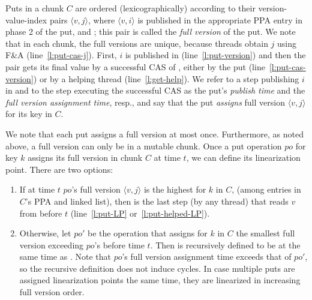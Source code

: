 Puts in a chunk $C$
are ordered (lexicographically) according to their version-value-index   pairs $\langle v, j \rangle$, where
$\langle v, i \rangle$ is published in the appropriate  PPA entry in phase 2 of the put, and ; this pair is called the \emph{full version} of the put.
We note that in each chunk, the full versions are unique, because threads obtain $j$ using F\&A (line~\ref{l:put-cas-j}).
First,  $i$ is published in  (line~\ref{l:put-version}) and then
the  pair gets its final value by a successful CAS of , either by the put (line~\ref{l:put-cas-version}) or by a helping thread (line~\ref {l:get-help}). 
We refer to 
a step publishing $i$ in  and to
the step executing the successful CAS  as the put's \emph{publish time} and the \emph{full version assignment time}, resp., 
and say that the put \emph{assigns} full version $\langle v, j \rangle$ for its key in $C$.

We note that each put assigns a full version at most once. 
Furthermore, as noted above, a full version can only be in a mutable chunk.
Once a put operation $po$ for key $k$ assigns its full version in chunk $C$ at time $t$, we can define its linearization point. 
There are two options: 
\begin{enumerate}
\item If at time $t$
$po$'s full version $\langle v, j \rangle$ is the highest for $k$ in $C$, (among entries in $C$'s {PPA} and  linked list),
then   is the last step (by any thread) that reads $v$ from  before $t$ (line~\ref{l:put-LP} or~\ref{l:put-helped-LP}). 
\item  Otherwise, let $po'$ be the 
 operation that assigns for $k$ in $C$ the smallest full version exceeding $po$'s
before time $t$. Then  is recursively defined to be at the same time as . Note that 
$po$'s full version assignment time exceeds that of  $po'$, so the recursive definition does not induce cycles. 
In case multiple puts are assigned linearization points the same time, they are linearized in increasing full version order.
\end{enumerate}




